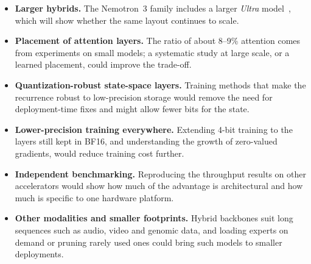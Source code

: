 \begin{itemize}
  \item \textbf{Larger hybrids.} The Nemotron~3 family includes a larger
        \emph{Ultra} model~\cite{nvidia2025nemotron3}, which will show whether
        the same layout continues to scale.
  \item \textbf{Placement of attention layers.} The ratio of about 8--9\%
        attention comes from experiments on small models; a systematic study
        at large scale, or a learned placement, could improve the trade-off.
  \item \textbf{Quantization-robust state-space layers.} Training methods that
        make the recurrence robust to low-precision storage would remove the
        need for deployment-time fixes and might allow fewer bits for the
        state.
  \item \textbf{Lower-precision training everywhere.} Extending 4-bit training
        to the layers still kept in BF16, and understanding the growth of
        zero-valued gradients, would reduce training cost further.
  \item \textbf{Independent benchmarking.} Reproducing the throughput results
        on other accelerators would show how much of the advantage is
        architectural and how much is specific to one hardware platform.
  \item \textbf{Other modalities and smaller footprints.} Hybrid backbones
        suit long sequences such as audio, video and genomic data, and loading
        experts on demand or pruning rarely used ones could bring such models
        to smaller deployments.
\end{itemize}
